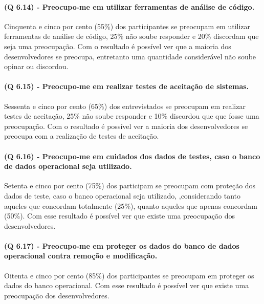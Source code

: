\paragraph{\textbf{(Q 6.14)} - Preocupo-me em utilizar ferramentas de análise de código.}

Cinquenta e cinco por cento (55{\%}) dos participantes se preocupam em utilizar ferramentas de análise de código, 25{\%} não soube responder e 20{\%} discordam que seja uma preocupação. Com o resultado é possível ver que a maioria dos desenvolvedores se preocupa, entretanto uma quantidade considerável não soube opinar ou discordou.

\paragraph{\textbf{(Q 6.15)} - Preocupo-me em realizar testes de aceitação de sistemas.}

Sessenta e cinco por cento (65{\%}) dos entrevistados se preocupam em realizar testes de aceitação, 25{\%} não soube responder e 10{\%} discordou que que fosse uma preocupação. Com o resultado é possível ver a maioria dos desenvolvedores se preocupa com a realização de testes de aceitação.

\paragraph{\textbf{(Q 6.16)} - Preocupo-me em cuidados dos dados de testes, caso o banco de dados operacional seja utilizado.}

Setenta e cinco por cento (75{\%}) dos participam se preocupam com proteção dos dados de teste, caso o banco operacional seja utilizado, ,considerando tanto aqueles que concordam totalmente (25{\%}), quanto aqueles que apenas concordam (50{\%}).  Com esse resultado é possível ver que existe uma preocupação dos desenvolvedores.

\paragraph{\textbf{(Q 6.17)} - Preocupo-me em proteger os dados do banco de dados operacional contra remoção e modificação.}

Oitenta e cinco por cento (85{\%}) dos participantes se preocupam em proteger os dados do banco operacional. Com esse resultado é possível ver que existe uma preocupação dos desenvolvedores.